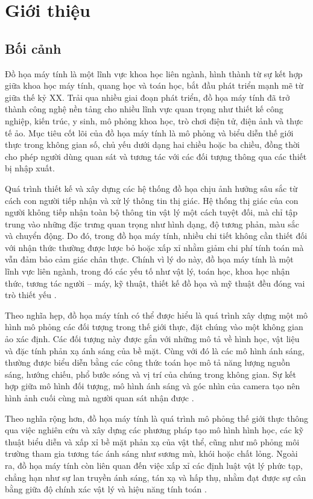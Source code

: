 \chapter{Giới thiệu}
\section{Bối cảnh}

Đồ họa máy tính là một lĩnh vực khoa học liên ngành, hình thành từ sự kết hợp giữa khoa học máy tính, quang học và toán học, bắt đầu phát triển mạnh mẽ từ giữa thế kỷ XX. Trải qua nhiều giai đoạn phát triển, đồ họa máy tính đã trở thành công nghệ nền tảng cho nhiều lĩnh vực quan trọng như thiết kế công nghiệp, kiến trúc, y sinh, mô phỏng khoa học, trò chơi điện tử, điện ảnh và thực tế ảo. Mục tiêu cốt lõi của đồ họa máy tính là mô phỏng và biểu diễn thế giới thực trong không gian số, chủ yếu dưới dạng hai chiều hoặc ba chiều, đồng thời cho phép người dùng quan sát và tương tác với các đối tượng thông qua các thiết bị nhập xuất.

Quá trình thiết kế và xây dựng các hệ thống đồ họa chịu ảnh hưởng sâu sắc từ cách con người tiếp nhận và xử lý thông tin thị giác. Hệ thống thị giác của con người không tiếp nhận toàn bộ thông tin vật lý một cách tuyệt đối, mà chỉ tập trung vào những đặc trưng quan trọng như hình dạng, độ tương phản, màu sắc và chuyển động. Do đó, trong đồ họa máy tính, nhiều chi tiết không cần thiết đối với nhận thức thường được lược bỏ hoặc xấp xỉ nhằm giảm chi phí tính toán mà vẫn đảm bảo cảm giác chân thực. Chính vì lý do này, đồ họa máy tính là một lĩnh vực liên ngành, trong đó các yếu tố như vật lý, toán học, khoa học nhận thức, tương tác người -- máy, kỹ thuật, thiết kế đồ họa và mỹ thuật đều đóng vai trò thiết yếu \cite{principles_1990}.

Theo nghĩa hẹp, đồ họa máy tính có thể được hiểu là quá trình xây dựng một mô hình mô phỏng các đối tượng trong thế giới thực, đặt chúng vào một không gian ảo xác định. Các đối tượng này được gắn với những mô tả về hình học, vật liệu và đặc tính phản xạ ánh sáng của bề mặt. Cùng với đó là các mô hình ánh sáng, thường được biểu diễn bằng các công thức toán học mô tả năng lượng nguồn sáng, hướng chiếu, phổ bước sóng và vị trí của chúng trong không gian. Sự kết hợp giữa mô hình đối tượng, mô hình ánh sáng và góc nhìn của camera tạo nên hình ảnh cuối cùng mà người quan sát nhận được \cite{principles_1990}.

Theo nghĩa rộng hơn, đồ họa máy tính là quá trình mô phỏng thế giới thực thông qua việc nghiên cứu và xây dựng các phương pháp tạo mô hình hình học, các kỹ thuật biểu diễn và xấp xỉ bề mặt phản xạ của vật thể, cũng như mô phỏng môi trường tham gia tương tác ánh sáng như sương mù, khói hoặc chất lỏng. Ngoài ra, đồ họa máy tính còn liên quan đến việc xấp xỉ các định luật vật lý phức tạp, chẳng hạn như sự lan truyền ánh sáng, tán xạ và hấp thụ, nhằm đạt được sự cân bằng giữa độ chính xác vật lý và hiệu năng tính toán \cite{principles_1990}.

